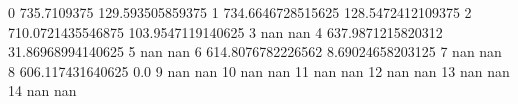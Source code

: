 0 735.7109375 129.593505859375
1 734.6646728515625 128.5472412109375
2 710.0721435546875 103.9547119140625
3 nan nan
4 637.9871215820312 31.86968994140625
5 nan nan
6 614.8076782226562 8.69024658203125
7 nan nan
8 606.117431640625 0.0
9 nan nan
10 nan nan
11 nan nan
12 nan nan
13 nan nan
14 nan nan
